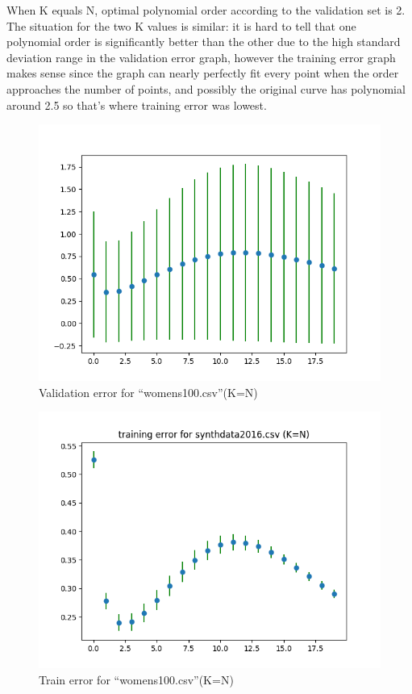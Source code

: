 \documentclass[12pt]{amsart}
\begin{document}
When K equals N, optimal polynomial order according to the validation set is 2. The situation for the two K values is similar: it is hard to tell that one polynomial order is significantly better than the other due to the high standard deviation range in the validation error graph, however the training error graph makes sense since the graph can nearly perfectly fit every point when the order approaches the number of points, and possibly the original curve has polynomial around 2.5 so that's where training error was lowest.\\
\begin{figure}
    \centering
    \includegraphics[scale=0.7]{K=N_women.png}
    \caption{Validation error for ``womens100.csv''(K=N)}
    \label{fig:my_label}
\end{figure}
\begin{figure}
    \centering
    \includegraphics[scale=0.7]{K=N_women_t.png}
    \caption{Train error for ``womens100.csv''(K=N)}
    \label{fig:my_label}
\end{figure}
\end{document}
